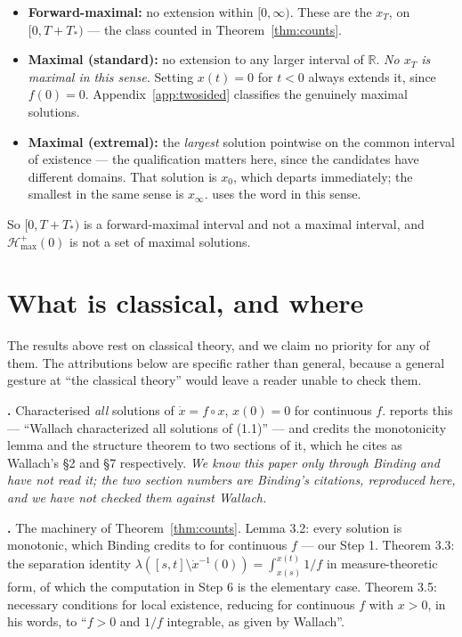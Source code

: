 \documentclass[12pt]{article}
\theoremstyle{plain}
\theoremstyle{definition}
\theoremstyle{remark}
\newcommand{\R}{\mathbb{R}}
\newcommand{\Hmax}{\mathcal{H}^{+}_{\max}}
\begin{document}
\begin{itemize}
  \item \textbf{Forward-maximal:} no extension within $[0,\infty)$. These are the
        $x_{T}$, on $[0,T+T_{*})$ --- the class counted in
        Theorem~\ref{thm:counts}.
  \item \textbf{Maximal (standard):} no extension to any larger interval of $\R$.
        \emph{No $x_{T}$ is maximal in this sense.} Setting $x(t)=0$ for $t<0$
        always extends it, since $f(0)=0$. Appendix~\ref{app:twosided}
        classifies the genuinely maximal solutions.
  \item \textbf{Maximal (extremal):} the \emph{largest} solution pointwise on
        the common interval of existence --- the qualification matters here,
        since the candidates have different domains. That solution is $x_{0}$,
        which departs immediately; the smallest in the same sense is
        $x_{\infty}$. \citet[ch.~III \S2]{Hartman} uses the word in this
        sense.
\end{itemize}

So $[0,T+T_{*})$ is a forward-maximal interval and not a maximal interval, and
$\Hmax(0)$ is not a set of maximal solutions.

\section{What is classical, and where}\label{sec:classical}

The results above rest on classical theory, and we claim no priority for any of
them. The attributions below are specific rather than general, because a general
gesture at ``the classical theory'' would leave a reader unable to check them.

\textbf{\citet{Wallach}.} Characterised \emph{all} solutions of
$\dot x=f\circ x$, $x(0)=0$ for continuous $f$. \citet[p.~184]{Binding} reports this --- ``Wallach characterized all solutions of (1.1)'' ---
and credits the monotonicity lemma and the structure theorem to two sections of
it, which he cites as Wallach's \S2 and \S7 respectively. \emph{We know this
paper only through Binding and have not read it; the two section numbers are
Binding's citations, reproduced here, and we have not checked them against
Wallach.}

\textbf{\citet[\S3, pp.~186--188]{Binding}.} The machinery of
Theorem~\ref{thm:counts}. Lemma 3.2: every solution is monotonic, which Binding
credits to \citet{Wallach} for continuous $f$ --- our Step 1.
Theorem 3.3: the separation identity
$\lambda([s,t]\setminus\dot x^{-1}(0))=\int_{x(s)}^{x(t)}1/f$ in
measure-theoretic form, of which the computation in Step 6 is the elementary
case. Theorem 3.5: necessary conditions for local existence, reducing for
continuous $f$ with $x>0$, in his words, to ``$f>0$ and $1/f$ integrable, as
given by Wallach''.
\end{document}
